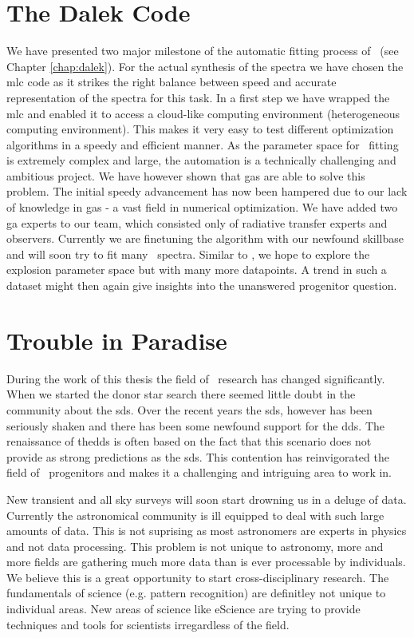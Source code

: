 \section{The Dalek Code}

We have presented two major milestone of the automatic fitting process of \sneia\ (see Chapter \vref{chap:dalek}). For the actual synthesis of the spectra we have chosen the \gls{mlc} code as it strikes the right balance between speed and accurate representation of the spectra for this task. 
In a first step we have wrapped the \gls{mlc} and enabled it to access a cloud-like computing environment (heterogeneous computing environment). This makes it very easy to test different optimization algorithms in a speedy and efficient manner. As the parameter space for \snia\ fitting is extremely complex and large, the automation is a technically challenging and ambitious project. We have however shown that \glspl{ga} are able to solve this problem. The initial speedy advancement has now been hampered due to our lack of knowledge in \glspl{ga} - a vast field in numerical optimization. We have added two \gls{ga} experts to our team, which consisted only of radiative transfer experts and observers. Currently we are finetuning the algorithm with our newfound skillbase and will soon try to fit many \snia\ spectra. Similar to \citet{2007Sci...315..825M}, we hope to explore the explosion parameter space but with many more datapoints. A trend in such a dataset might then again give insights into the unanswered progenitor question.

\section{Trouble in Paradise}

During the work of this thesis the field of \snia\ research has changed significantly. When we started the donor star search there seemed little doubt in the community about the \gls{sds}. Over the recent years the \gls{sds}, however has been seriously shaken and there has been some newfound support for the \gls{dds}. The renaissance of the\gls{dds} is often based on the fact that this scenario does not provide as strong predictions as the \gls{sds}. This contention has reinvigorated the field of \snia\ progenitors and makes it a challenging and intriguing area to work in.

New transient and all sky surveys will soon start drowning us in a deluge of data. Currently the astronomical community is ill equipped to deal with such large amounts of data. This is not suprising as most astronomers are experts in physics and not data processing. This problem is not unique to astronomy, more and more fields are gathering much more data than is ever processable by individuals. We believe this is a great opportunity to start cross-disciplinary research. The fundamentals of science (e.g. pattern recognition) are definitley not unique to individual areas. New areas of science like eScience are trying to provide techniques and tools for scientists irregardless of the field. 

